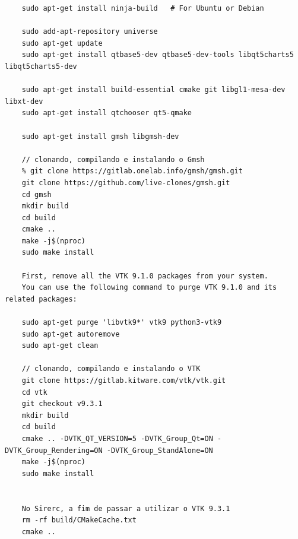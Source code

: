 \documentclass[a4paper,11pt]{article}
\begin{document}
\begin{verbatim}
	sudo apt-get install ninja-build   # For Ubuntu or Debian
	
	sudo add-apt-repository universe
	sudo apt-get update
	sudo apt-get install qtbase5-dev qtbase5-dev-tools libqt5charts5 libqt5charts5-dev
	
	sudo apt-get install build-essential cmake git libgl1-mesa-dev libxt-dev
	sudo apt-get install qtchooser qt5-qmake
	
	sudo apt-get install gmsh libgmsh-dev
	
	// clonando, compilando e instalando o Gmsh
	% git clone https://gitlab.onelab.info/gmsh/gmsh.git
	git clone https://github.com/live-clones/gmsh.git
	cd gmsh
	mkdir build
	cd build
	cmake ..
	make -j$(nproc)
	sudo make install
	
	First, remove all the VTK 9.1.0 packages from your system.
	You can use the following command to purge VTK 9.1.0 and its related packages:
	
	sudo apt-get purge 'libvtk9*' vtk9 python3-vtk9
	sudo apt-get autoremove
	sudo apt-get clean
	
	// clonando, compilando e instalando o VTK
	git clone https://gitlab.kitware.com/vtk/vtk.git
	cd vtk
	git checkout v9.3.1
	mkdir build
	cd build
	cmake .. -DVTK_QT_VERSION=5 -DVTK_Group_Qt=ON -DVTK_Group_Rendering=ON -DVTK_Group_StandAlone=ON
	make -j$(nproc)
	sudo make install
	
	
	No Sirerc, a fim de passar a utilizar o VTK 9.3.1
	rm -rf build/CMakeCache.txt
	cmake ..
	
\end{verbatim}
\end{document}
